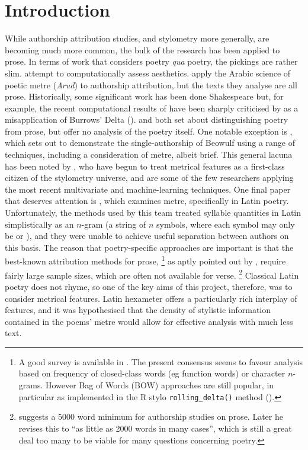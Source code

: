 \documentclass[11pt,a4paper]{scrartcl} %
\begin{document}
\section{Introduction}
While authorship attribution studies, and stylometry more generally, are becoming much more common, the bulk of the research has been applied to prose. In terms of work that considers poetry \textit{qua} poetry, the pickings are rather slim. \cite{kao_computational_2012} attempt to computationally assess aesthetics. \cite{omer_arud_2017} apply the Arabic science of poetic metre (\textit{Arud}) to authorship attribution, but the texts they analyse are all prose. Historically, some significant work has been done Shakespeare but, for example, the recent computational results of \cite{ilsemann_christopher_2018} have been sharply criticised by \cite{barber_marlowe_2019} as a misapplication of Burrows' Delta (\cite{burrows_delta:_2002}). \cite{tizhoosh_poetic_2008} and \cite{chaudhuri_small_nodate} both set about distinguishing poetry from prose, but offer no analysis of the poetry itself. One notable exception is \cite{neidorf_large-scale_2019}, which sets out to demonstrate the single-authorship of Beowulf using a range of techniques, including a consideration of metre, albeit brief. This general lacuna has been noted by \cite{plechac_versification_2019}, who have begun to treat metrical features as a first-class citizen of the stylometry universe, and are some of the few researchers applying the most recent multivariate and machine-learning techniques. One final paper that deserves attention is \cite{forstall_evidence_2011}, which examines metre, specifically in Latin poetry. Unfortunately, the methods used by this team treated syllable quantities in Latin simplistically as an $n$-gram (a string of $n$ symbols, where each symbol may only be  or \metricsymbols{_}), and they were unable to achieve useful separation between authors on this basis. The reason that poetry-specific approaches are important is that the best-known attribution methods for prose,%
%
\footnote{A good survey is available in \cite{jockers_comparative_2010}. The present consensus seems to favour analysis based on frequency of closed-class words (eg function words) or character $n$-grams. However Bag of Words (BOW) approaches are still popular, in particular as implemented in the R stylo \texttt{rolling\_delta()} method (\cite{r_stylo}).}
as aptly pointed out by \cite{eder_does_2015}, require fairly large sample sizes, which are often not available for verse.%
%
\footnote{\cite{eder_does_2015} suggests a 5000 word minimum for authorship studies on prose. Later \cite[4]{eder_short_2017} he revises this to ``as little as 2000 words in many cases'', which is still a great deal too many to be viable for many questions concerning poetry.}
%
Classical Latin poetry does not rhyme, so one of the key aims of this project, therefore, was to consider metrical features. Latin hexameter offers a particularly rich interplay of features, and it was hypothesised that the density of stylistic information contained in the poems' metre would allow for effective analysis with much less text.
\end{document}
